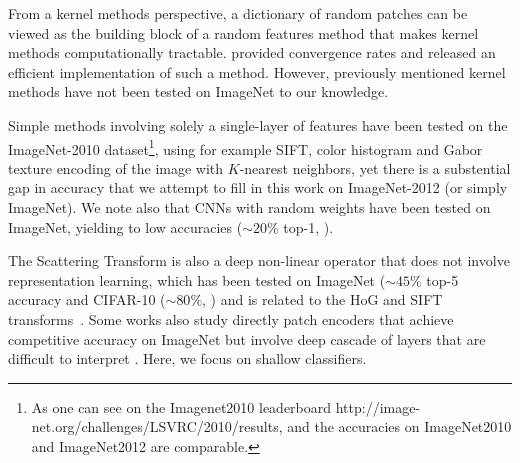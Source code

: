 \documentclass{article} %
\begin{document}
From a kernel methods perspective, a dictionary of random patches can be viewed as the building block of a random features method \citep{rahimi2008random} that makes kernel methods computationally tractable.
\cite{rudi2017falkon} provided convergence rates and released an efficient implementation of such a method.
However, previously mentioned kernel methods \citep{mairal2016end,li2019enhanced,shankar2020neural} have not been tested on ImageNet to our knowledge.

Simple methods involving solely a single-layer of  features  have been tested on the ImageNet-2010 dataset\footnote{ As one can see on the Imagenet2010 leaderboard http://image-net.org/challenges/LSVRC/2010/results, and the accuracies on ImageNet2010 and ImageNet2012 are comparable.}, using for example SIFT, color histogram and Gabor texture encoding of the image with $K$-nearest neighbors, yet there is a substential gap in accuracy that we attempt to fill in this work on ImageNet-2012 (or simply ImageNet). We note also that CNNs with random weights have been tested on ImageNet, yielding to low accuracies ($\sim 20\%$ top-1, \citep{arandjelovic2017look}).

The Scattering Transform \citep{mallat2012group} is also a deep non-linear operator that does not involve representation learning, which has been tested on ImageNet ($\sim 45\%$ top-5 accuracy \citep{zarka2019deep} and  CIFAR-10 ($\sim 80 \%$, \citep{Oyallon_2015_CVPR}) and is related to the HoG and SIFT transforms~\citep{Oyallon_2018_ECCV}.
Some works also study directly patch encoders that achieve competitive accuracy on ImageNet but involve deep cascade of layers that are difficult to interpret \citep{oyallon2017scaling,zarka2019deep,brendel2019approximating}. Here, we focus on shallow classifiers.







 
\end{document}
